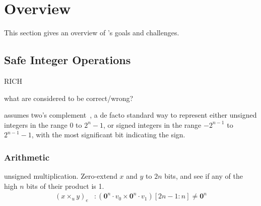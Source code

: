 \section{Overview}
\label{s:oview}

This section gives an overview of \sys's goals and challenges.

\subsection{Safe Integer Operations}

\newcommand{\zeros}[1]{\mathbf{0}^{#1}}
\newcommand{\ones}[1]{\mathbf{1}^{#1}}
\newcommand{\concat}{\cdot}

\newcommand{\smin}{\mathrm{smin}}
\newcommand{\smax}{\mathrm{smax}}
\newcommand{\umax}{\mathrm{umax}}

\newcommand{\sadde}{\mathtt{sadd}_e}
\newcommand{\uadde}{\mathtt{uadd}_e}
\newcommand{\ssube}{\mathtt{ssub}_e}
\newcommand{\usube}{\mathtt{usub}_e}
\newcommand{\smule}{\mathtt{smul}_e}
\newcommand{\umule}[2]{(#1 \times_u #2)_e}
\newcommand{\sdive}{\mathtt{sdiv}_e}
\newcommand{\udive}{\mathtt{udiv}_e}
\newcommand{\shle}[2]{(#1\ \cc{<}\cc{<}\ #2)_e}
\newcommand{\shre}[2]{(#1\ \cc{>}\cc{>}\ #2)_e}
\newcommand{\conve}{\mathtt{conv}_e}

RICH~\cite{brumley:rich}

what are considered to be correct/wrong?

\sys assumes two's complement~\cite{intel:int}, a de facto
standard way to represent either unsigned integers in the range $0$
to $2^n-1$, or signed integers in the range $-2^{n-1}$ to $2^{n-1}-1$,
with the most significant bit indicating the sign.

\subsubsection*{Arithmetic}

unsigned multiplication.
Zero-extend $x$ and $y$ to $2n$ bits, and see if any of the high $n$ bits of their product is 1.
\begin{align}
\umule{x}{y}&: %
(\zeros{n}\concat v_0 \times \zeros{n}\concat v_1)[2n-1:n] \neq \zeros{n}
\end{align}



